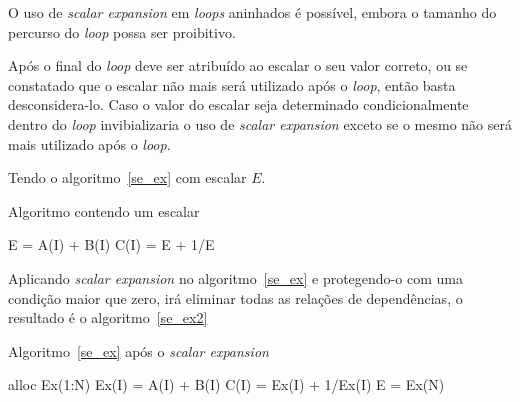 O uso de \textit{scalar expansion} em \textit{loops} aninhados é possível,
embora o tamanho do percurso do \textit{loop} possa ser proibitivo.

Após o final do \textit{loop} deve ser atribuído ao escalar o seu valor correto,
ou se constatado que o escalar não mais será utilizado após o \textit{loop},
então basta desconsidera-lo.
Caso o valor do escalar seja determinado condicionalmente dentro do
\textit{loop} invibializaria o uso de \textit{scalar expansion} exceto se o
mesmo não será mais utilizado após o \textit{loop}.

Tendo o algoritmo~\ref{se_ex} com escalar $E$.


\begin{algorithm}
\caption{Algoritmo contendo um escalar}
\label{se_ex}
\begin{algorithmic}[1]

\STATE E = A(I) + B(I)
\STATE C(I) = E + 1/E
\ENDFOR

\end{algorithmic}
\end{algorithm}

Aplicando \textit{scalar expansion} no algoritmo~\ref{se_ex} e protegendo-o com
uma condição maior que zero, irá eliminar todas as relações de dependências, o
resultado é o algoritmo~\ref{se_ex2}

\begin{algorithm}
\caption{Algoritmo~\ref{se_ex} após o \textit{scalar expansion}}
\label{se_ex2}
\begin{algorithmic}[1]

\STATE alloc Ex(1:N)
\STATE Ex(I) = A(I) + B(I)
\STATE C(I) = Ex(I) + 1/Ex(I)
\ENDFOR
\STATE E = Ex(N)
\ENDIF

\end{algorithmic}
\end{algorithm}





